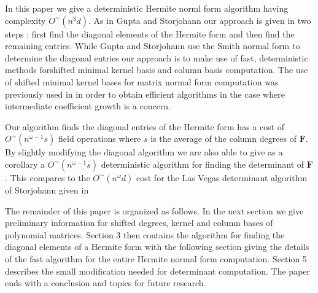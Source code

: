In this paper we give a deterministic Hermite norml form algorithm
having complexity $O^{\sim}\left(n^{3}d\right)$. As in Gupta and
Storjohann our approach is given in two steps : first find the diagonal
elements of the Hermite form and then find the remaining entries.
While Gupta and Storjohann use the Smith normal form to determine
the diagonal entries our approach is to make use of fast, deterministic
methods forshifted minimal kernel basis and column basis computation.
The use of shifted minimal kernel bases for matrix normal form computation
was previously used in \citep{BLV:1999,BLV:jsc06} in order to obtain
efficient algorithms in the case where intermediate coefficient growth
is a concern.

Our algorithm finds the diagonal entries of the Hermite form has a
cost of $O^{\sim}\left(n^{\omega-1}s\right)$ field operations where
$s$ is the average of the column degrees of $\mathbf{F}$. By slightly
modifying the diagonal algorithm we are also able to give as a corollary
a $O^{\sim}\left(n^{\omega-1}s\right)$ deterministic algorithm for
finding the determinant of $\mathbf{F}$. This compares to the $O^{\sim}\left(n^{\omega}d\right)$
cost for the Las Vegas determinant algorithm of Storjohann given in
\citep{storjohann:2002,storjohann:2003}

The remainder of this paper is organized as follows. In the next section
we give preliminary information for shifted degrees, kernel and column
bases of polynomial matrices. Section 3 then contains the algorithm
for finding the diagonal elements of a Hermite form with the following
section giving the details of the fast algorithm for the entire Hermite
normal form computation. Section 5 describes the small modification
needed for determinant computation. The paper ends with a conclusion
and topics for future research. 

